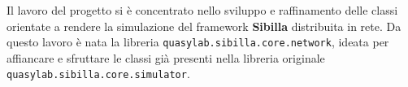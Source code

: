 
Il lavoro del progetto si è concentrato nello sviluppo e raffinamento delle classi orientate a rendere la simulazione del framework \textbf{Sibilla} distribuita in rete.
Da questo lavoro è nata la libreria \texttt{quasylab.sibilla.core.network}, ideata per affiancare e sfruttare le classi già presenti nella libreria originale \texttt{quasylab.sibilla.core.simulator}.